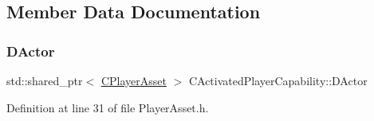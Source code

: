 \subsection{Member Data Documentation}
\hypertarget{classCActivatedPlayerCapability_a54ca944b47bff2718330639941d402b0}{}\label{classCActivatedPlayerCapability_a54ca944b47bff2718330639941d402b0} 
\subsubsection{\texorpdfstring{D\+Actor}{DActor}}
{\footnotesize\ttfamily std\+::shared\+\_\+ptr$<$ \hyperlink{classCPlayerAsset}{C\+Player\+Asset} $>$ C\+Activated\+Player\+Capability\+::\+D\+Actor\hspace{0.3cm}{\ttfamily [protected]}}



Definition at line 31 of file Player\+Asset.\+h.



